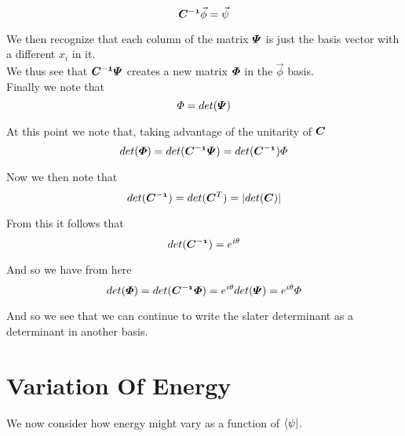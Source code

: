 \documentclass[11pt]{article} %
\begin{document}
\begin{equation}
\matrixsym{C^{-1}}\vec{\phi}=\vec{\psi}
\end{equation}

We then recognize that each column of the matrix $\matrixsym{\Psi}$ is just the basis vector with a different $x_i$ in it.\\

We thus see that $\matrixsym{C^{-1}}\matrixsym{\Psi}$ creates a new matrix $\matrixsym{\Phi}$ in the $\vec{\phi}$ basis.\\

Finally we note that\\

\begin{equation} \Phi=det(\matrixsym{\Psi}) \end{equation}

At this point we note that, taking advantage of the unitarity of $\matrixsym{C}$\\

\begin{equation} 
det(\matrixsym{\Phi})=det(\matrixsym{C^{-1}}\matrixsym{\Psi})=det(\matrixsym{C^{-1}})\Phi
\end{equation}

Now we then note that \\
\begin{equation}
det(\matrixsym{C^{-1}})=det({\matrixsym{C}^{T}})=|det({\matrixsym{C}})|
\end{equation}

From this it follows that 
\begin{equation}
det(\matrixsym{C^{-1}})=e^{i\theta}
\end{equation}

And so we have from here\\

\begin{equation}
det(\matrixsym{\Phi})=det(\matrixsym{C^{-1}}\matrixsym{\Phi})=e^{i\theta}det(\matrixsym{\Psi})=e^{i\theta}\Phi
\end{equation}

And so we see that we can continue to write the slater determinant as a determinant in another basis.

\section{Variation Of Energy}

We now consider how energy might vary as a function of $\bra{\psi}$.\\
\end{document}
